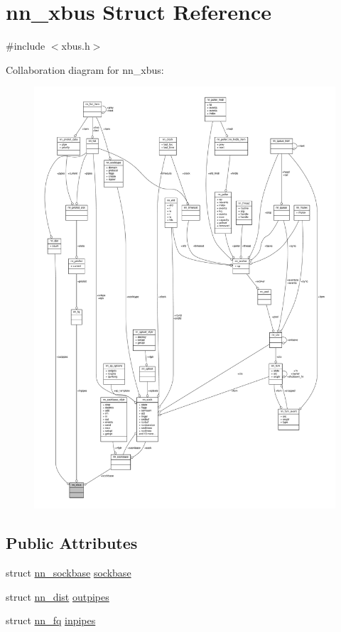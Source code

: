 \hypertarget{structnn__xbus}{}\section{nn\+\_\+xbus Struct Reference}
\label{structnn__xbus}


{\ttfamily \#include $<$xbus.\+h$>$}



Collaboration diagram for nn\+\_\+xbus\+:\nopagebreak
\begin{figure}[H]
\begin{center}
\leavevmode
\includegraphics[width=350pt]{structnn__xbus__coll__graph}
\end{center}
\end{figure}
\subsection*{Public Attributes}
\begin{DoxyCompactItemize}
\item 
struct \hyperlink{structnn__sockbase}{nn\+\_\+sockbase} \hyperlink{structnn__xbus_a68b2737065ec78b74c38087a7ce55bc4}{sockbase}
\item 
struct \hyperlink{structnn__dist}{nn\+\_\+dist} \hyperlink{structnn__xbus_a48445675e3b8c5a6f8c71e1815b30505}{outpipes}
\item 
struct \hyperlink{structnn__fq}{nn\+\_\+fq} \hyperlink{structnn__xbus_a8360c87f314c042ec1e91d4c4c57c8d6}{inpipes}
\end{DoxyCompactItemize}


